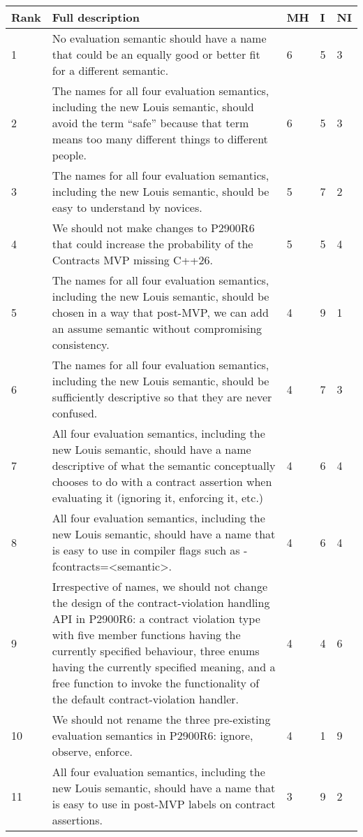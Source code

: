\begin{longtable}{|p{0.8cm}|p{11.5cm}|p{0.6cm}|p{0.6cm}|p{0.6cm}|}
\hline 
Rank & Full description & MH & I & NI \\
\hline 
1  & No evaluation semantic should have a name that could be an equally good or better fit for a different semantic. & 6 & 5 & 3 \\ \hline
2  & The names for all four evaluation semantics, including the new Louis semantic, should avoid the term ``safe'' because that term means too many different things to different people. & 6 & 5 & 3 \\ \hline
3  & The names for all four evaluation semantics, including the new Louis semantic, should be easy to understand by novices. & 5 & 7 & 2 \\ \hline
4  & We should not make changes to P2900R6 that could increase the probability of the Contracts MVP missing C++26. & 5 & 5 & 4 \\ \hline
5  & The names for all four evaluation semantics, including the new Louis semantic, should be chosen in a way that post-MVP, we can add an assume semantic without compromising consistency. & 4 & 9 & 1 \\ \hline
6  & The names for all four evaluation semantics, including the new Louis semantic, should be sufficiently descriptive so that they are never confused. & 4 & 7 & 3 \\ \hline
7  & All four evaluation semantics, including the new Louis semantic, should have a name descriptive of what the semantic conceptually chooses to do with a contract assertion when evaluating it (ignoring it, enforcing it, etc.) & 4 & 6 & 4 \\ \hline
8  & All four evaluation semantics, including the new Louis semantic, should have a name that is easy to use in compiler flags such as -fcontracts=<semantic>. & 4 & 6 & 4 \\ \hline
9  & Irrespective of names, we should not change the design of the contract-violation handling API in P2900R6: a contract violation type with five member functions having the currently specified behaviour, three enums having the currently specified meaning, and a free function to invoke the functionality of the default contract-violation handler. & 4 & 4 & 6 \\ \hline
10 & We should not rename the three pre-existing evaluation semantics in P2900R6: ignore, observe, enforce. & 4 & 1 & 9 \\ \hline
11 & All four evaluation semantics, including the new Louis semantic, should have a name that is easy to use in post-MVP labels on contract assertions. & 3 & 9 & 2 \\ \hline

\end{longtable}
